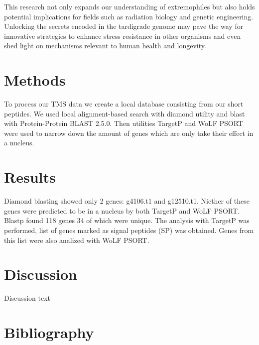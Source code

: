 \documentclass{article}
\begin{document}
This research not only expands our understanding of extremophiles but also holds potential implications for fields such as radiation biology and genetic engineering. Unlocking the secrets encoded in the tardigrade genome may pave the way for innovative strategies to enhance stress resistance in other organisms and even shed light on mechanisms relevant to human health and longevity.

\section{Methods}
To process our TMS data we create a local database consisting from our short peptides. We used local alignment-based search with diamond \cite{buchfink_fast_2015} utility and blast with Protein-Protein BLAST 2.5.0. Then utilities TargetP \cite{armenteros_detecting_2019} and WoLF PSORT \cite{noauthor_wolf_nodate} were used to narrow down the amount of genes which are only take their effect in a nucleus. 

\section{Results}
Diamond blasting showed only 2 genes: g4106.t1 and g12510.t1. Niether of these genes were predicted to be in a nucleus by both TargetP and WoLF PSORT. Blastp found 118 genes 34 of which were unique. The analysis with TargetP was performed, list of genes marked as signal peptides (SP) was obtained. Genes from this list were also analized with WoLF PSORT.

\section{Discussion}
Discussion text

\newpage
\section{Bibliography}


\end{document}
